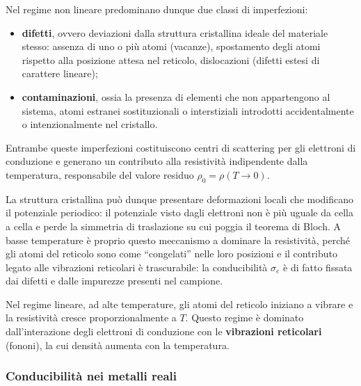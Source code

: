 Nel regime non lineare predominano dunque due classi di imperfezioni:
\begin{itemize}
    \item \textbf{difetti}, ovvero deviazioni dalla struttura cristallina ideale del materiale stesso: assenza di uno o più atomi (vacanze), spostamento degli atomi rispetto alla posizione attesa nel reticolo, dislocazioni (difetti estesi di carattere lineare);
    \item \textbf{contaminazioni}, ossia la presenza di elementi che non appartengono al sistema, atomi estranei sostituzionali o interstiziali introdotti accidentalmente o intenzionalmente nel cristallo.
\end{itemize}
Entrambe queste imperfezioni costituiscono centri di scattering per gli elettroni di conduzione e generano un contributo alla resistività indipendente dalla temperatura, responsabile del valore residuo \( \rho_0 = \rho(T \to 0) \).

La struttura cristallina può dunque presentare deformazioni locali che modificano il potenziale periodico: il potenziale visto dagli elettroni non è più uguale da cella a cella e perde la simmetria di traslazione su cui poggia il teorema di Bloch. A basse temperature è proprio questo meccanismo a dominare la resistività, perché gli atomi del reticolo sono come ``congelati'' nelle loro posizioni e il contributo legato alle vibrazioni reticolari è trascurabile: la conducibilità \( \sigma_e \) è di fatto fissata dai difetti e dalle impurezze presenti nel campione.

Nel regime lineare, ad alte temperature, gli atomi del reticolo iniziano a vibrare e la resistività cresce proporzionalmente a \( T \). Questo regime è dominato dall'interazione degli elettroni di conduzione con le \textbf{vibrazioni reticolari} (fononi), la cui densità aumenta con la temperatura.

\subsubsection{Conducibilità nei metalli reali}

